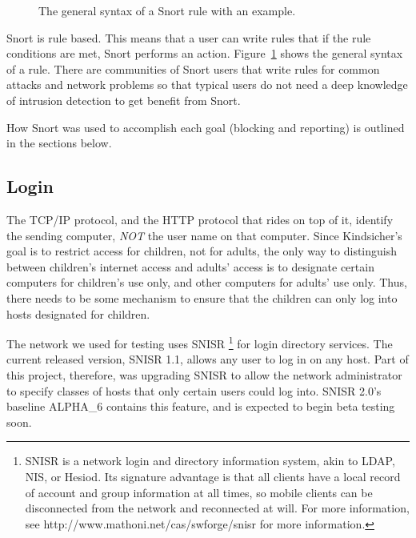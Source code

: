 \begin{figure}[!t]
    \centering
    \theverbbox
    \caption{The general syntax of a Snort rule with an example.}
    \label{fig:rule_syntax}
\end{figure}

Snort is rule based. This means that a user can write rules that if the rule
conditions are met, Snort performs an action. Figure~\ref{fig:rule_syntax}
shows the general syntax of a rule. There are communities of Snort users that
write rules for common attacks and network problems so that typical users do
not need a deep knowledge of intrusion detection to get benefit from Snort.


How Snort was used to accomplish each goal (blocking and reporting) is outlined
in the sections below.

\subsection{Login}

The TCP/IP protocol, and the HTTP protocol that rides on top of it, identify
the sending computer, \emph{NOT} the user name on that computer.  
% 
Since Kindsicher's goal is to restrict access for children, not for adults,
the only way to distinguish between children's internet access and adults'
access is to designate certain computers for children's use only, and other
computers for adults' use only.  
%
Thus, there needs to be some mechanism to ensure that the children can only
log into hosts designated for children.

The network we used for testing uses SNISR 
%
\footnote{ SNISR is a network login and directory information system, akin to
LDAP, NIS, or Hesiod.  Its signature advantage is that all clients have a
local record of account and group information at all times, so mobile clients
can be disconnected from the network and reconnected at will.  For more
information, see http://www.mathoni.net/cas/swforge/snisr for more
information. }
%
for login directory services.  
%
The current released version, SNISR 1.1, allows any user to log in on any host.  
%
Part of this project, therefore, was upgrading SNISR to allow the network
administrator to specify classes of hosts that only certain users could log
into.
%
SNISR 2.0's baseline ALPHA_6 contains this feature, and is expected to begin
beta testing soon.


